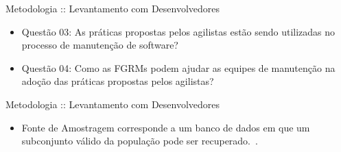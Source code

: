 \documentclass[t,14pt,mathserif]{beamer}
\begin{document}
\begin{frame}{Metodologia :: Levantamento com Desenvolvedores}

    \begin{itemize}
        \item Questão 03: As práticas propostas pelos agilistas estão
            sendo utilizadas no processo de manutenção de software?
        \item Questão 04: Como as FGRMs podem ajudar as equipes de
            manutenção na adoção das práticas propostas pelos agilistas?
    \end{itemize}

\end{frame}

\begin{frame}{Metodologia :: Levantamento com Desenvolvedores}

    \begin{itemize}
        \item Fonte de Amostragem corresponde a um banco de dados em que um
              subconjunto válido da população pode ser
              recuperado.~\cite{de2014towards}.
    \end{itemize}

    \begin{table}[htpb]
        \centering
        \caption{Fontes de Amostragem utilizadas no estudo}
\label{tab:fontes-amostragens}
    \end{table}
\end{frame}
\end{document}
